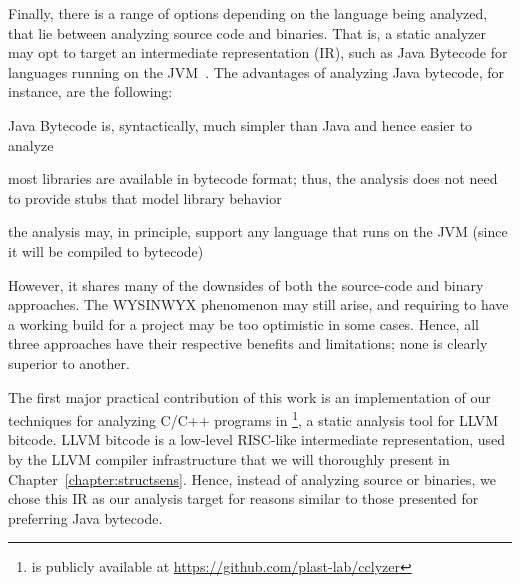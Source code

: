Finally, there is a range of options depending on the language being
analyzed, that lie between analyzing source code and binaries. That
is, a static analyzer may opt to target an intermediate representation
(IR), such as Java Bytecode for languages running on the
JVM~\cite{Lindholm:1999:JVM:553607}. The advantages of analyzing Java
bytecode, for instance, are the following:
\begin{compactitem}[\(\cdot\)]
\item Java Bytecode is, syntactically, much simpler than Java and
  hence easier to analyze
\item most libraries are available in bytecode format; thus, the
  analysis does not need to provide stubs that model library behavior
\item the analysis may, in principle, support any language that runs
  on the JVM (since it will be compiled to bytecode)
\end{compactitem}
However, it shares many of the downsides of both the source-code and
binary approaches. The WYSINWYX phenomenon may still arise, and
requiring to have a working build for a project may be too optimistic
in some cases. Hence, all three approaches have their respective
benefits and limitations; none is clearly superior to another.

The first major practical contribution of this work is an
implementation of our techniques for analyzing C/C++ programs in
\cclyzer{}\footnote{\cclyzer{} is publicly available at
  \url{https://github.com/plast-lab/cclyzer}}, a static analysis tool
for LLVM bitcode. LLVM bitcode is a low-level RISC-like intermediate
representation, used by the LLVM compiler infrastructure
\cite{cgo/LattnerA04} that we will thoroughly present in
Chapter~\ref{chapter:structsens}. Hence, instead of analyzing source
or binaries, we chose this IR as our analysis target for reasons
similar to those presented for preferring Java bytecode.

